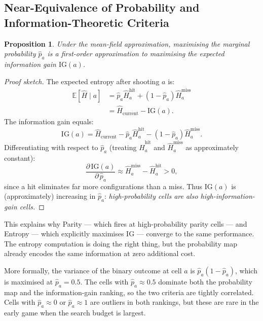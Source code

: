 \documentclass[12pt,a4paper]{article}
\newtheorem{proposition}[theorem]{Proposition}
\newcommand{\E}{\mathbb{E}}
\newcommand{\1}{\mathbf{1}}
\begin{document}
\subsection{Near-Equivalence of Probability and Information-Theoretic Criteria}
\label{sec:near_equiv}

\begin{proposition}
  Under the mean-field approximation, maximising the marginal probability
  $\hat{p}_a$ is a first-order approximation to maximising the expected
  information gain $\mathrm{IG}(a)$.
\end{proposition}

\begin{proof}[Proof sketch]
  The expected entropy after shooting $a$ is:
  \begin{align}
    \E[\hat{H} \mid a]
      &= \hat{p}_a \hat{H}^{\text{hit}}_a + (1-\hat{p}_a)\hat{H}^{\text{miss}}_a \\
      &= \hat{H}_{\text{current}} - \mathrm{IG}(a).
  \end{align}
  The information gain equals:
  \begin{equation}
    \mathrm{IG}(a)
    = \hat{H}_{\text{current}} - \hat{p}_a \hat{H}^{\text{hit}}_a
      - (1-\hat{p}_a)\hat{H}^{\text{miss}}_a.
    \label{eq:ig_expand}
  \end{equation}
  Differentiating with respect to $\hat{p}_a$ (treating $\hat{H}^{\text{hit}}_a$
  and $\hat{H}^{\text{miss}}_a$ as approximately constant):
  \begin{equation}
    \frac{\partial\,\mathrm{IG}(a)}{\partial\,\hat{p}_a}
    \approx \hat{H}^{\text{miss}}_a - \hat{H}^{\text{hit}}_a > 0,
  \end{equation}
  since a hit eliminates far more configurations than a miss.  Thus
  $\mathrm{IG}(a)$ is (approximately) increasing in $\hat{p}_a$:
  \emph{high-probability cells are also high-information-gain cells.}
\end{proof}

\noindent This explains why Parity --- which fires at high-probability parity cells
--- and Entropy --- which explicitly maximises $\mathrm{IG}$ --- converge to the
same performance.  The entropy computation is doing the right thing, but the
probability map already encodes the same information at zero additional cost.

More formally, the variance of the binary outcome at cell $a$ is
$\hat{p}_a(1-\hat{p}_a)$, which is maximised at $\hat{p}_a = 0.5$.  The
cells with $\hat{p}_a \approx 0.5$ dominate both the probability map and the
information-gain ranking, so the two criteria are tightly correlated.  Cells
with $\hat{p}_a \approx 0$ or $\hat{p}_a \approx 1$ are outliers in both
rankings, but these are rare in the early game when the search budget is largest.
\end{document}
